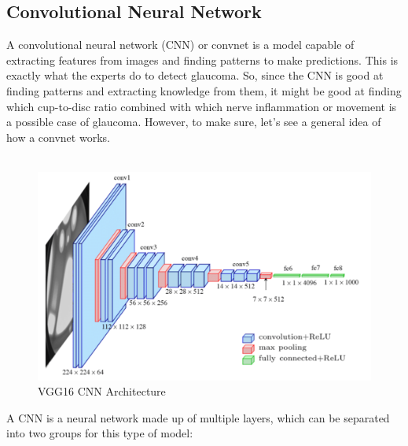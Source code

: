 \documentclass[11pt, a4paper]{article}
\begin{document}
\subsection{Convolutional Neural Network}
A convolutional neural network (CNN) or convnet is a model capable of extracting features from images and finding patterns to make predictions. This is exactly what the experts do to detect glaucoma. So, since the CNN is good at finding patterns and extracting knowledge from them, it might be good at finding which cup-to-disc ratio combined with which nerve inflammation or movement is a possible case of glaucoma. However, to make sure, let's see a general idea of how a convnet works.\\\\
\begin{figure}[H]
	\centering
	\includegraphics[width=12.5cm]{imgs/general/VGG16-CNN-Architecture.png}
	\caption{VGG16 CNN Architecture}
	 \label{fig:VGG16-CNN-Architecture}
\end{figure}
\noindent A CNN is a neural network made up of multiple layers, which can be separated into two groups for this type of model:
\end{document}
